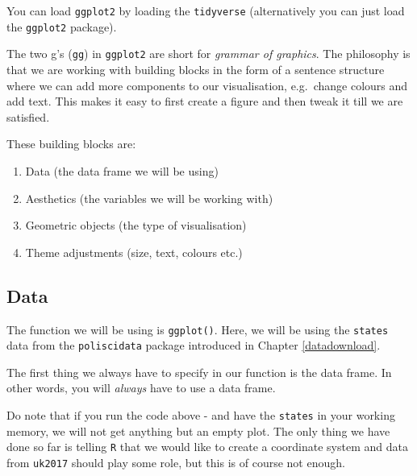 \documentclass[12pt,oneside]{reedthesis}
\providecommand{\tightlist}{%
  \setlength{\itemsep}{0pt}\setlength{\parskip}{0pt}}
\theoremstyle{definition}
\theoremstyle{definition}
\theoremstyle{definition}
\theoremstyle{remark}
\begin{document}
  You can load \texttt{ggplot2} by loading the \texttt{tidyverse}
  (alternatively you can just load the \texttt{ggplot2} package).
  \begin{Shaded}
  \begin{Highlighting}[]
  \NormalTok{(}\NormalTok{)}
  \end{Highlighting}
  \end{Shaded}
  The two g's (\texttt{gg}) in \texttt{ggplot2} are short for
  \emph{grammar of graphics}. The philosophy is that we are working with
  building blocks in the form of a sentence structure where we can add
  more components to our visualisation, e.g.~change colours and add text.
  This makes it easy to first create a figure and then tweak it till we
  are satisfied.
  
  These building blocks are:
  \begin{enumerate}
  \def\labelenumi{\arabic{enumi}.}
  \tightlist
  \item
    Data (the data frame we will be using)
  \item
    Aesthetics (the variables we will be working with)
  \item
    Geometric objects (the type of visualisation)
  \item
    Theme adjustments (size, text, colours etc.)
  \end{enumerate}
  \subsection{Data}\label{data}
  
  The function we will be using is \texttt{ggplot()}. Here, we will be
  using the \texttt{states} data from the \texttt{poliscidata} package
  introduced in Chapter \ref{datadownload}.
  \begin{Shaded}
  \begin{Highlighting}[]
  \NormalTok{(}\NormalTok{)}
  \StringTok{ }
  \end{Highlighting}
  \end{Shaded}
  The first thing we always have to specify in our function is the data
  frame. In other words, you will \emph{always} have to use a data frame.
  \begin{Shaded}
  \begin{Highlighting}[]
  \end{Highlighting}
  \end{Shaded}
  Do note that if you run the code above - and have the \texttt{states} in
  your working memory, we will not get anything but an empty plot. The
  only thing we have done so far is telling \texttt{R} that we would like
  to create a coordinate system and data from \texttt{uk2017} should play
  some role, but this is of course not enough.
  
\end{document}
